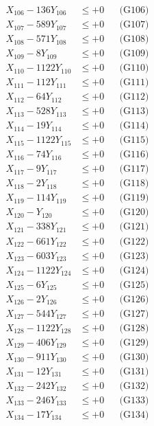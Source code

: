 \documentclass[a4paper,10pt]{article}
\begin{document}
{\begin{align}
X_{106} - 136Y_{106} &\leq +0 && \text{(G106)} \\
X_{107} - 589Y_{107} &\leq +0 && \text{(G107)} \\
X_{108} - 571Y_{108} &\leq +0 && \text{(G108)} \\
X_{109} - 8Y_{109} &\leq +0 && \text{(G109)} \\
X_{110} - 1122Y_{110} &\leq +0 && \text{(G110)} \\
\allowbreak
X_{111} - 112Y_{111} &\leq +0 && \text{(G111)} \\
X_{112} - 64Y_{112} &\leq +0 && \text{(G112)} \\
X_{113} - 528Y_{113} &\leq +0 && \text{(G113)} \\
X_{114} - 19Y_{114} &\leq +0 && \text{(G114)} \\
X_{115} - 1122Y_{115} &\leq +0 && \text{(G115)} \\
X_{116} - 74Y_{116} &\leq +0 && \text{(G116)} \\
X_{117} - 9Y_{117} &\leq +0 && \text{(G117)} \\
X_{118} - 2Y_{118} &\leq +0 && \text{(G118)} \\
X_{119} - 114Y_{119} &\leq +0 && \text{(G119)} \\
X_{120} - Y_{120} &\leq +0 && \text{(G120)} \\
\allowbreak
X_{121} - 338Y_{121} &\leq +0 && \text{(G121)} \\
X_{122} - 661Y_{122} &\leq +0 && \text{(G122)} \\
X_{123} - 603Y_{123} &\leq +0 && \text{(G123)} \\
X_{124} - 1122Y_{124} &\leq +0 && \text{(G124)} \\
X_{125} - 6Y_{125} &\leq +0 && \text{(G125)} \\
X_{126} - 2Y_{126} &\leq +0 && \text{(G126)} \\
X_{127} - 544Y_{127} &\leq +0 && \text{(G127)} \\
X_{128} - 1122Y_{128} &\leq +0 && \text{(G128)} \\
X_{129} - 406Y_{129} &\leq +0 && \text{(G129)} \\
X_{130} - 911Y_{130} &\leq +0 && \text{(G130)} \\
\allowbreak
X_{131} - 12Y_{131} &\leq +0 && \text{(G131)} \\
X_{132} - 242Y_{132} &\leq +0 && \text{(G132)} \\
X_{133} - 246Y_{133} &\leq +0 && \text{(G133)} \\
X_{134} - 17Y_{134} &\leq +0 && \text{(G134)} \\

\end{align}}
\end{document}
